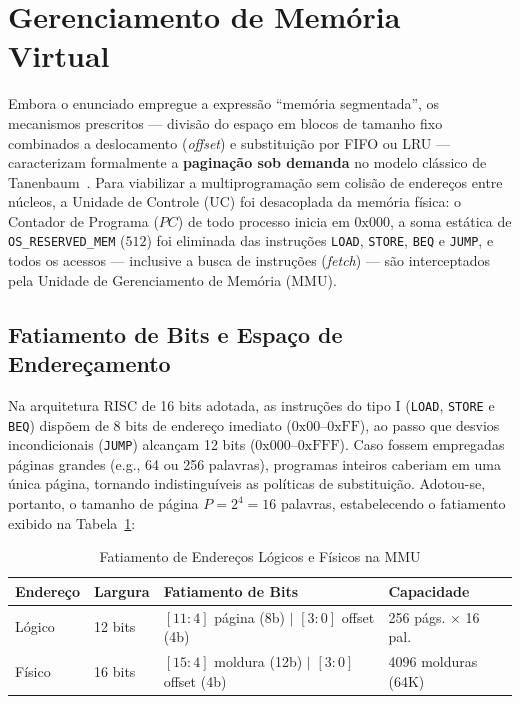 \documentclass[conference]{IEEEtran}
\begin{document}
\section{Gerenciamento de Memória Virtual}
\label{sec:mem}

Embora o enunciado empregue a expressão ``memória segmentada'', os mecanismos prescritos --- divisão do espaço em blocos de tamanho fixo combinados a deslocamento (\textit{offset}) e substituição por FIFO ou LRU --- caracterizam formalmente a \textbf{paginação sob demanda} no modelo clássico de Tanenbaum~\cite{tanenbaum2015}. Para viabilizar a multiprogramação sem colisão de endereços entre núcleos, a Unidade de Controle (UC) foi desacoplada da memória física: o Contador de Programa ($PC$) de todo processo inicia em $0\text{x}000$, a soma estática de \texttt{OS\_RESERVED\_MEM} ($512$) foi eliminada das instruções \texttt{LOAD}, \texttt{STORE}, \texttt{BEQ} e \texttt{JUMP}, e todos os acessos --- inclusive a busca de instruções (\textit{fetch}) --- são interceptados pela Unidade de Gerenciamento de Memória (MMU).

\subsection{Fatiamento de Bits e Espaço de Endereçamento}
Na arquitetura RISC de 16 bits adotada, as instruções do tipo I (\texttt{LOAD}, \texttt{STORE} e \texttt{BEQ}) dispõem de 8 bits de endereço imediato ($0\text{x}00$--$0\text{xFF}$), ao passo que desvios incondicionais (\texttt{JUMP}) alcançam 12 bits ($0\text{x}000$--$0\text{xFFF}$). Caso fossem empregadas páginas grandes (e.g., 64 ou 256 palavras), programas inteiros caberiam em uma única página, tornando indistinguíveis as políticas de substituição. Adotou-se, portanto, o tamanho de página $P = 2^4 = 16$ palavras, estabelecendo o fatiamento exibido na Tabela~\ref{tab:fatiamento_mmu}:

\begin{table}[htbp]
\caption{Fatiamento de Endereços Lógicos e Físicos na MMU}
\label{tab:fatiamento_mmu}
\centering
\footnotesize
\begin{tabular}{@{}llll@{}}
\toprule
\textbf{Endereço} & \textbf{Largura} & \textbf{Fatiamento de Bits} & \textbf{Capacidade} \\
\midrule
Lógico  & 12 bits & $[11:4]$ página (8b) $\mid$ $[3:0]$ offset (4b) & 256 págs. $\times$ 16 pal. \\
Físico  & 16 bits & $[15:4]$ moldura (12b) $\mid$ $[3:0]$ offset (4b) & 4096 molduras (64K) \\
\bottomrule
\end{tabular}
\end{table}
\end{document}
